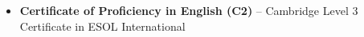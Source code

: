 



\begin{itemize}
    \item \textbf{Certificate of Proficiency in English (C2)} -- Cambridge Level 3 Certificate in ESOL International
\end{itemize}










